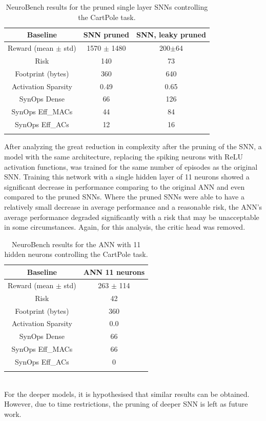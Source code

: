 \begin{table}[ht]
\centering
\renewcommand{\arraystretch}{1.5}
\begin{tabular}{c|cc} \thickhline
 Baseline & SNN pruned & SNN, leaky pruned \\ \hline
 Reward (mean $\pm$ std) & 1570 $\pm$ 1480 & 200$\pm$64  \\
 Risk & 140 & 73 \\ \hline
 Footprint (bytes) & 360 & 640\\
 Activation Sparsity & 0.49 & 0.65 \\
 SynOps Dense & 66 & 126 \\
 SynOps Eff\_MACs & 44 & 84 \\
 SynOps Eff\_ACs & 12 & 16 \\ \thickhline
\end{tabular}
\caption{NeuroBench results for the pruned single layer SNNs controlling the CartPole task.}
\label{tab:inprunedout_results}
\end{table}

After analyzing the great reduction in complexity after the pruning of the SNN, a model with the same architecture, replacing the spiking neurons with ReLU activation functions, was trained for the same number of episodes as the original SNN. Training this network with a single hidden layer of 11 neurons showed a significant decrease in performance comparing to the original ANN and even compared to the pruned SNNs. Where the pruned SNNs were able to have a relatively small decrease in average performance and a reasonable risk, the ANN's average performance degraded significantly with a risk that may be unacceptable in some circumstances. Again, for this analysis, the critic head was removed.
\begin{table}[ht]
\centering
\renewcommand{\arraystretch}{1.5}
\begin{tabular}{c|c} \thickhline
 Baseline & ANN 11 neurons  \\ \hline
 Reward (mean $\pm$ std) & 263 $\pm$ 114 \\
 Risk & 42\\ \hline
 Footprint (bytes) & 360\\
 Activation Sparsity & 0.0 \\
 SynOps Dense & 66  \\
 SynOps Eff\_MACs & 66\\
 SynOps Eff\_ACs & 0 \\ \thickhline
\end{tabular}
\caption{NeuroBench results for the ANN with 11 hidden neurons controlling the CartPole task.}
\label{tab:inprunedout_results}
\end{table}
\\
For the deeper models, it is hypothesised that similar results can be obtained. However, due to time restrictions, the pruning of deeper SNN is left as future work.

